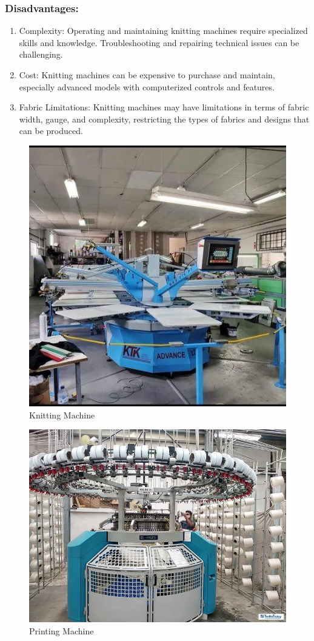 \subsubsection{Disadvantages:}

\begin{enumerate}
\item
  Complexity: Operating and maintaining knitting machines require
  specialized skills and knowledge. Troubleshooting and repairing
  technical issues can be challenging.
\item
  Cost: Knitting machines can be expensive to purchase and maintain,
  especially advanced models with computerized controls and features.
\item
  Fabric Limitations: Knitting machines may have limitations in terms of
  fabric width, gauge, and complexity, restricting the types of fabrics
  and designs that can be produced.
\end{enumerate}

\begin{figure}[h!]
  \centering
  \includegraphics[width=0.7\linewidth]{figs/production/image5.jpg}
  \caption{Knitting Machine}
  \label{fig:Knitting Machine}
\end{figure}

\begin{figure}[h!]
  \centering
  \includegraphics[width=0.7\linewidth]{figs/production/image6.jpg}
  \caption{Printing Machine}
  \label{fig:Printing Machine}
\end{figure}



